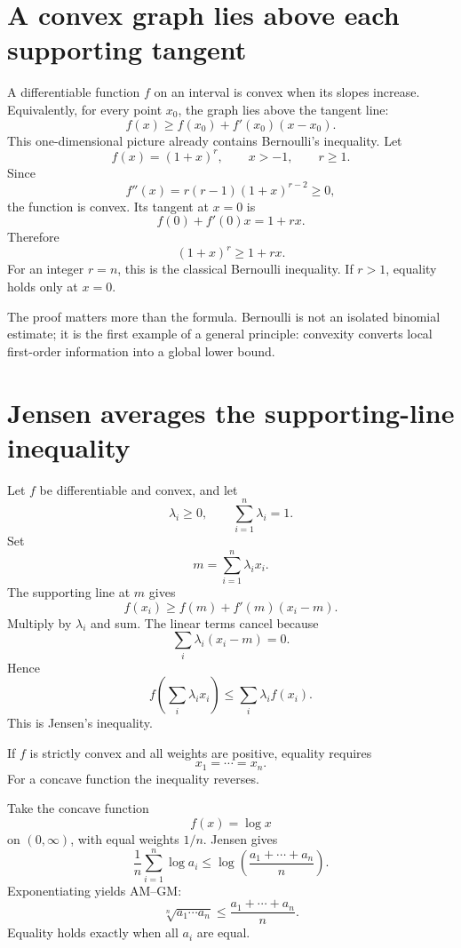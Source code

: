 
\section{A convex graph lies above each supporting tangent}

A differentiable function \(f\) on an interval is convex when its slopes increase.  Equivalently, for every point \(x_0\), the graph lies above the tangent line:
\[
  \boxed{
  f(x)\ge f(x_0)+f'(x_0)(x-x_0).}
\]
This one-dimensional picture already contains Bernoulli's inequality.  Let
\[
  f(x)=(1+x)^r,
  \qquad x>-1,
  \qquad r\ge1.
\]
Since
\[
  f''(x)=r(r-1)(1+x)^{r-2}\ge0,
\]
the function is convex.  Its tangent at \(x=0\) is
\[
  f(0)+f'(0)x=1+rx.
\]
Therefore
\[
  \boxed{(1+x)^r\ge1+rx.}
\]
For an integer \(r=n\), this is the classical Bernoulli inequality.  If \(r>1\), equality holds only at \(x=0\).

The proof matters more than the formula.  Bernoulli is not an isolated binomial estimate; it is the first example of a general principle: convexity converts local first-order information into a global lower bound.

\section{Jensen averages the supporting-line inequality}

Let \(f\) be differentiable and convex, and let
\[
  \lambda_i\ge0,
  \qquad
  \sum_{i=1}^n\lambda_i=1.
\]
Set
\[
  m=\sum_{i=1}^n\lambda_i x_i.
\]
The supporting line at \(m\) gives
\[
  f(x_i)\ge f(m)+f'(m)(x_i-m).
\]
Multiply by \(\lambda_i\) and sum.  The linear terms cancel because
\[
  \sum_i\lambda_i(x_i-m)=0.
\]
Hence
\[
  \boxed{
  f\left(\sum_i\lambda_i x_i\right)
  \le
  \sum_i\lambda_i f(x_i).}
\]
This is Jensen's inequality.

If \(f\) is strictly convex and all weights are positive, equality requires
\[
  x_1=\cdots=x_n.
\]
For a concave function the inequality reverses.

Take the concave function
\[
  f(x)=\log x
\]
on \((0,\infty)\), with equal weights \(1/n\).  Jensen gives
\[
  \frac1n\sum_{i=1}^n\log a_i
  \le
  \log\left(\frac{a_1+\cdots+a_n}{n}\right).
\]
Exponentiating yields AM--GM:
\[
  \boxed{
  \sqrt[n]{a_1\cdots a_n}
  \le
  \frac{a_1+\cdots+a_n}{n}.}
\]
Equality holds exactly when all \(a_i\) are equal.

